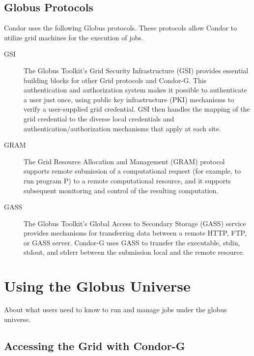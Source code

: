 \subsection{Globus Protocols}
Condor uses the following Globus protocols.
These protocols allow Condor to utilize grid machines for
the execution of jobs.
\begin{description}
\item[GSI]
The Globus Toolkit's Grid Security Infrastructure (GSI) provides essential
building blocks for other Grid protocols and Condor-G.
This authentication and authorization system
makes it possible to authenticate a user just once,
using public key infrastructure (PKI) mechanisms to verify
a user-supplied grid credential.
GSI then handles the mapping of the grid credential to the
diverse local credentials and authentication/authorization mechanisms that
apply at each site. 
\item[GRAM]
The Grid Resource Allocation and Management (GRAM) protocol supports remote
submission of a computational request (for example, to run program P)
to a remote computational resource,
and it supports subsequent monitoring and control of the resulting
computation. 
\item[GASS]
The Globus Toolkit's Global Access to Secondary Storage (GASS) service provides
mechanisms for transferring data between a remote HTTP, FTP, or GASS server. 
Condor-G uses GASS to transfer the executable, stdin, stdout, and stderr
between the submission local and the remote resource.
\end{description}

\section{\label{sec:Using-Condor-G}Using the Globus Universe}

About what users need to know to run and manage jobs under
the globus universe.

\subsection{Accessing the Grid with Condor-G}

